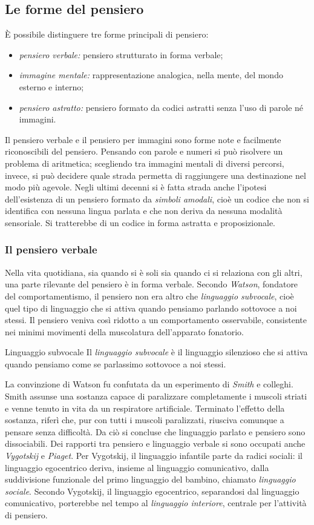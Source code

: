 \documentclass[a4paper]{article}
\begin{document}
\subsection{Le forme del pensiero}
È possibile distinguere tre forme principali di pensiero:
\begin{itemize}
    \item \emph{pensiero verbale:} pensiero strutturato in forma verbale;
    \item \emph{immagine mentale:} rappresentazione analogica, nella mente, del mondo esterno e interno;
    \item \emph{pensiero astratto:} pensiero formato da codici astratti senza l'uso di parole né immagini.
\end{itemize}
Il pensiero verbale e il pensiero per immagini sono forme note e facilmente riconoscibili del pensiero. Pensando con parole e numeri si può risolvere un problema di aritmetica; scegliendo tra immagini mentali di diversi percorsi, invece, si può decidere quale strada permetta di raggiungere una destinazione nel modo più agevole.
Negli ultimi decenni si è fatta strada anche l'ipotesi dell'esistenza di un pensiero formato da \emph{simboli amodali}, cioè un codice che non si identifica con nessuna lingua parlata e che non deriva da nessuna modalità sensoriale. Si tratterebbe di un codice in forma astratta e proposizionale.
\subsubsection{Il pensiero verbale}
Nella vita quotidiana, sia quando si è soli sia quando ci si relaziona con gli altri, una parte rilevante del pensiero è in forma verbale.
Secondo \emph{Watson}, fondatore del comportamentismo, il pensiero non era altro che \emph{linguaggio subvocale}, cioè quel tipo di linguaggio che si attiva quando pensiamo parlando sottovoce a noi stessi. Il pensiero veniva così ridotto a un comportamento osservabile, consistente nei minimi movimenti della muscolatura dell'apparato fonatorio.
\begin{snippetdefinition}{Linguaggio subvocale}
    Il \emph{linguaggio subvocale} è il linguaggio silenzioso che si attiva quando pensiamo come se parlassimo sottovoce a noi stessi.
\end{snippetdefinition}
La convinzione di Watson fu confutata da un esperimento di \emph{Smith} e colleghi. Smith assunse una sostanza capace di paralizzare completamente i muscoli striati e venne tenuto in vita da un respiratore artificiale. Terminato l'effetto della sostanza, riferì che, pur con tutti i muscoli paralizzati, riusciva comunque a pensare senza difficoltà. Da ciò si concluse che linguaggio parlato e pensiero sono dissociabili.
Dei rapporti tra pensiero e linguaggio verbale si sono occupati anche \emph{Vygotskij} e \emph{Piaget}. Per Vygotskij, il linguaggio infantile parte da radici sociali: il linguaggio egocentrico deriva, insieme al linguaggio comunicativo, dalla suddivisione funzionale del primo linguaggio del bambino, chiamato \emph{linguaggio sociale}. Secondo Vygotskij, il linguaggio egocentrico, separandosi dal linguaggio comunicativo, porterebbe nel tempo al \emph{linguaggio interiore}, centrale per l'attività di pensiero.
\end{document}
